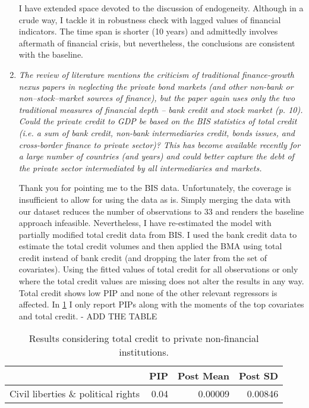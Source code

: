 \begin{enumerate}
    I have extended space devoted to the discussion of endogeneity. Although in a crude way, I tackle it in robustness check with lagged values of financial indicators. The time span is shorter (10 years) and admittedly involves aftermath of financial crisis, but nevertheless, the conclusions are consistent with the baseline.

    \item \textit{The review of literature mentions the criticism of traditional finance-growth nexus papers in neglecting the private bond markets (and other non-bank or non--stock--market sources of finance), but the paper again uses only the two traditional measures of financial depth -- bank credit and stock market (p. 10). Could the private credit to GDP be based on the BIS statistics of total credit (i.e. a sum of bank credit, non-bank intermediaries credit, bonds issues, and cross-border finance to private sector)? This has become available recently for a large number of countries (and years) and could better capture the debt of the private sector intermediated by all intermediaries and markets.}
    
    Thank you for pointing me to the \ac{BIS} data. Unfortunately, the coverage is insufficient to allow for using the data as is. Simply merging the data with our dataset reduces the number of observations to 33 and renders the baseline approach infeasible. Nevertheless, I have re-estimated the model with partially modified total credit data from BIS. I used the bank credit data to estimate the total credit volumes and then applied the \ac{BMA} using total credit instead of bank credit (and dropping the later from the set of covariates). Using the fitted values of total credit for all observations or only where the total credit values are missing does not alter the results in any way. Total credit shows low \ac{PIP} and none of the other relevant regressors is affected. In {\color{red}\ref{chA:tab1} I only report \acp{PIP} along with the moments of the top covariates and total credit. - ADD THE TABLE}
\end{enumerate}

\begin{table}[ht!]
  \caption{Results considering total credit to private non-financial institutions.}\label{chA:tab1}
    \footnotesize
    \centering
  \begin{tabular}{lrrr}
    \toprule
                                 & PIP & Post Mean & Post SD \\
    \midrule
  Civil liberties \& political rights & 0.04 & 0.00009 & 0.00846 \\
    \bottomrule
  \end{tabular}
\end{table}

